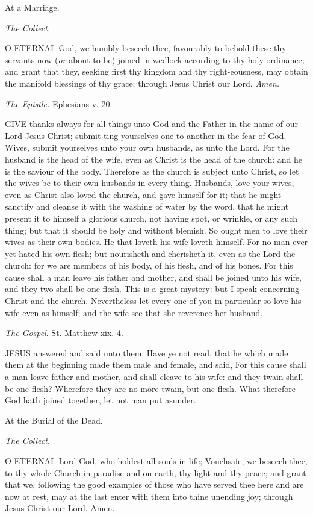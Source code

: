 At a Marriage.

\emph{The Collect.}

O
ETERNAL God, we humbly beseech thee, favourably to behold these thy servants
now (\emph{or} about to be) joined in wedlock according to thy holy
ordinance; and grant that they, seeking first thy kingdom and thy right-eousness,
may obtain the manifold blessings of thy grace; through Jesus Christ our
Lord. \emph{Amen.}

\emph{The Epistle.} Ephesians v. 20.

GIVE thanks always for
all things unto God and the Father in the name of our Lord Jesus Christ;
submit-ting yourselves one to another in the fear of God. Wives, submit
yourselves unto your own husbands, as unto the Lord. For the husband is
the head of the wife, even as Christ is the head of the church: and he
is the saviour of the body. Therefore as the church is subject unto Christ,
so let the wives be to their own husbands in every thing. Husbands, love
your wives, even as Christ also loved the church, and gave himself for
it; that he might sanctify and cleanse it with the washing of water by
the word, that he might present it to himself a glorious church, not having
spot, or wrinkle, or any such thing; but that it should be holy and without
blemish. So ought men to love their wives as their own bodies. He that
loveth his wife loveth himself. For no man ever yet hated his own flesh;
but nourisheth and cherisheth it, even as the Lord the church: for we
are members of his body, of his flesh, and of his bones. For this cause
shall a man leave his father and mother, and shall be joined unto his
wife, and they two shall be one flesh. This is a great mystery: but I
speak concerning Christ and the church. Nevertheless let every one of
you in particular so love his wife even as himself; and the wife see that
she reverence her husband.

\emph{The Gospel}. St. Matthew xix. 4.

JESUS answered and said
unto them, Have ye not read, that he which made them at the beginning
made them male and female, and said, For this cause shall a man leave
father and mother, and shall cleave to his wife: and they twain shall
be one flesh? Wherefore they are no more twain, but one flesh. What therefore
God hath joined together, let not man put asunder.

At the Burial of the Dead.

\emph{The Collect.}

O ETERNAL Lord God, who
holdest all souls in life; Vouchsafe, we beseech thee, to thy whole Church
in paradise and on earth, thy light and thy peace; and grant that we,
following the good examples of those who have served thee here and are
now at rest, may at the last enter with them into thine unending joy;
through Jesus Christ our Lord. Amen.

